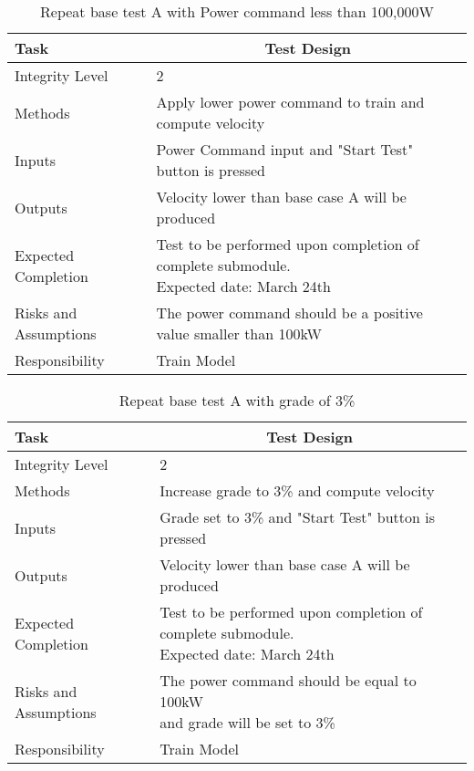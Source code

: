 \documentclass[]{article}
\begin{document}
    \begin{table}[H]
    	\centering
    	\caption{Repeat base test A with Power command less than 100,000W}
    	\begin{tabular}{|l|l|}
    		\hline
    		Task & \multicolumn{1}{c|}{Test Design} \\ \hline
    		Integrity Level & 2 \\ \hline
    		Methods & Apply lower power command to train and compute velocity  \\ \hline
    		Inputs &  Power Command input and "Start Test" button is pressed \\ \hline
    		Outputs &  Velocity lower than base case A will be produced  \\ \hline
    		Expected Completion & \parbox[t]{10cm}{Test to be performed upon completion of complete submodule.\\ Expected date: March 24th}\\ \hline
    		Risks and Assumptions & The power command should be a positive value smaller than 100kW \\ \hline
    		Responsibility & Train Model\\ \hline
    	\end{tabular}
    \end{table}

	\begin{table}[H]
		\centering
		\caption{Repeat base test A with grade of 3\%}
		\begin{tabular}{|l|l|}
			\hline
			Task & \multicolumn{1}{c|}{Test Design} \\ \hline
			Integrity Level & 2 \\ \hline
			Methods & Increase grade to 3\% and compute velocity  \\ \hline
			Inputs &  Grade set to 3\% and "Start Test" button is pressed \\ \hline
			Outputs &  Velocity lower than base case A will be produced  \\ \hline
			Expected Completion & \parbox[t]{10cm}{Test to be performed upon completion of complete submodule.\\ Expected date: March 24th}\\ \hline
			Risks and Assumptions & \parbox[t]{10cm}{The power command should be equal to 100kW \\and grade will be set to 3\% }\\ \hline
			Responsibility & Train Model\\ \hline
		\end{tabular}
	\end{table}
\end{document}
